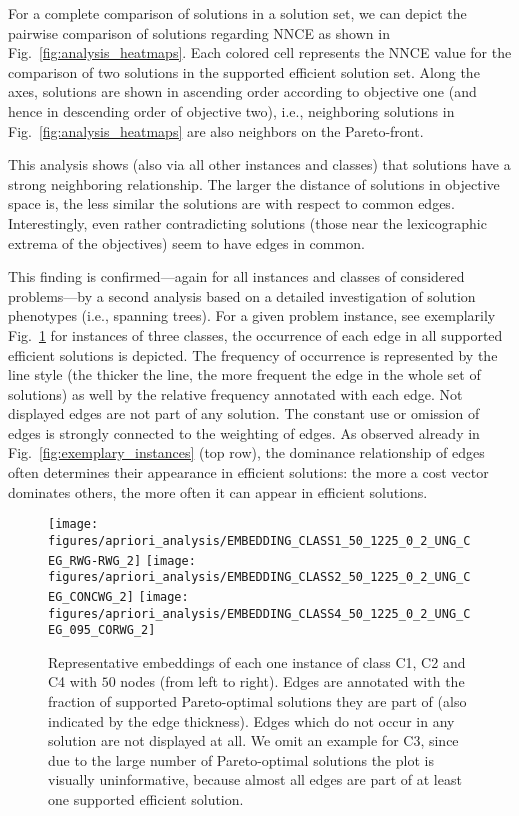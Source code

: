 \documentclass[twoside]{article}
\begin{document}
For a complete comparison of solutions in a solution set, we can depict the pairwise comparison of solutions regarding NNCE as shown in Fig.~\ref{fig:analysis_heatmaps}. Each colored cell represents the NNCE value for the comparison of two solutions in the supported efficient solution set. Along the axes, solutions are shown in ascending order according to objective one (and hence in descending order of objective two), i.e., neighboring solutions in Fig.~\ref{fig:analysis_heatmaps} are also neighbors on the Pareto-front.

This analysis shows (also via all other instances and classes) that solutions have a strong neighboring relationship. The larger the distance of solutions in objective space is, the less similar the solutions are with respect to common edges. Interestingly, even rather contradicting solutions (those near the lexicographic extrema of the objectives) seem to have edges in common.

This finding is confirmed---again for all instances and classes of considered problems---by a second analysis based on a detailed investigation of solution phenotypes (i.e., spanning trees). For a given problem instance, see exemplarily Fig.~\ref{fig:analysis_embeddings} for instances of three classes, the occurrence of each edge in all supported efficient solutions is depicted. The frequency of occurrence is represented by the line style (the thicker the line, the more frequent the edge in the whole set of solutions) as well by the relative frequency annotated with each edge. Not displayed edges are not part of any solution. The constant use or omission of edges is strongly connected to the weighting of edges. As observed already in Fig.~\ref{fig:exemplary_instances} (top row), the dominance relationship of edges often determines their appearance in efficient solutions: the more a cost vector dominates others, the more often it can appear in efficient solutions.   

\begin{figure}[t]
  \centering
  \texttt{[image: figures/apriori\_analysis/EMBEDDING\_CLASS1\_50\_1225\_0\_2\_UNG\_CEG\_RWG-RWG\_2]}
  \hspace{-1cm}
  \texttt{[image: figures/apriori\_analysis/EMBEDDING\_CLASS2\_50\_1225\_0\_2\_UNG\_CEG\_CONCWG\_2]}
  \hspace{-1cm}
  \texttt{[image: figures/apriori\_analysis/EMBEDDING\_CLASS4\_50\_1225\_0\_2\_UNG\_CEG\_095\_CORWG\_2]}
  \caption{Representative embeddings of each one instance of class C1, C2 and C4 with $50$ nodes (from left to right). Edges are annotated with the fraction of supported Pareto-optimal solutions they are part of (also indicated by the edge thickness). Edges which do not occur in any solution are not displayed at all. We omit an example for C3, since due to the large number of Pareto-optimal solutions the plot is visually uninformative, because almost all edges are part of at least one supported efficient solution.}
  \label{fig:analysis_embeddings}
\end{figure}
\end{document}

